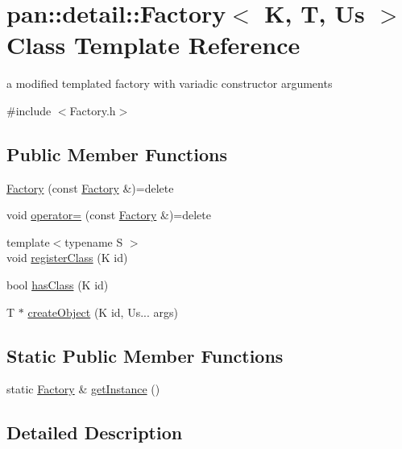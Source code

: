 \hypertarget{classpan_1_1detail_1_1_factory}{}\section{pan\+:\+:detail\+:\+:Factory$<$ K, T, Us $>$ Class Template Reference}
\label{classpan_1_1detail_1_1_factory}


a modified templated factory with variadic constructor arguments  




{\ttfamily \#include $<$Factory.\+h$>$}

\subsection*{Public Member Functions}
\begin{DoxyCompactItemize}
\item 
\hyperlink{classpan_1_1detail_1_1_factory_a8bede97b9ebe191c4f44d3f466f479b3}{Factory} (const \hyperlink{classpan_1_1detail_1_1_factory}{Factory} \&)=delete
\item 
void \hyperlink{classpan_1_1detail_1_1_factory_a4ef5146a216ceade5b8c0b06bab2a38c}{operator=} (const \hyperlink{classpan_1_1detail_1_1_factory}{Factory} \&)=delete
\item 
{\footnotesize template$<$typename S $>$ }\\void \hyperlink{classpan_1_1detail_1_1_factory_a1618a041575a6f490a327c5ee5b0cefc}{register\+Class} (K id)
\item 
bool \hyperlink{classpan_1_1detail_1_1_factory_ad7abea702880d5355cf37dfe5aba786d}{has\+Class} (K id)
\item 
T $\ast$ \hyperlink{classpan_1_1detail_1_1_factory_a30fe3b9f6541e9f611edb51bd54584e5}{create\+Object} (K id, Us... args)
\end{DoxyCompactItemize}
\subsection*{Static Public Member Functions}
\begin{DoxyCompactItemize}
\item 
static \hyperlink{classpan_1_1detail_1_1_factory}{Factory} \& \hyperlink{classpan_1_1detail_1_1_factory_a8c96fc8688874e5e8dd4532368a562ea}{get\+Instance} ()
\end{DoxyCompactItemize}


\subsection{Detailed Description}
